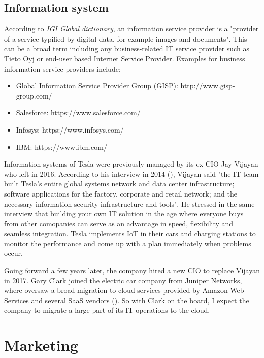 \documentclass[12pt]{article}
\begin{document}
\subsection{Information system}

According to \textit{IGI Global dictionary}, an information service provider is a "provider of a service typified by digital data, for example images and documents". This can be a broad term including any business-related IT service provider such as Tieto Oyj or end-user based Internet Service Provider. Examples for business information service providers include:

\begin{itemize}
	\item{Global Information Service Provider Group (GISP): http://www.gisp-group.com/}
	\item{Salesforce: https://www.salesforce.com/}
	\item{Infosys: https://www.infosys.com/}
	\item{IBM: https://www.ibm.com/}
\end{itemize}

Information systems of Tesla were previously managed by its ex-CIO Jay Vijayan who left in 2016. According to his interview in 2014 (\cite{vi14}), Vijayan said "the IT team built Tesla's entire global systems network and data center infrastructure; software applications for the factory, corporate and retail network; and the necessary information security infrastructure and tools". He stressed in the same interview that building your own IT solution in the age where everyone buys from other comopanies can serve as an advantage in speed, flexibility and seamless integration. Tesla implements IoT in their cars and charging stations to monitor the performance and come up with a plan immediately when problems occur.

Going forward a few years later, the company hired a new CIO to replace Vijayan in 2017. Gary Clark joined the electric car company from Juniper Networks, where oversaw a broad migration to cloud services provided by Amazon Web Services and several SaaS vendors (\cite{bo17}). So with Clark on the board, I expect the company to migrate a large part of its IT operations to the cloud.

\section{Marketing}

\end{document}
